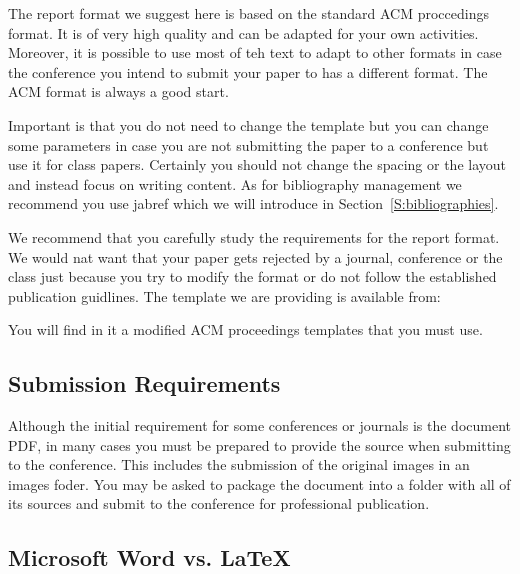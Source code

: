 The report format we suggest here is based on the standard ACM
proccedings format. It is of very high quality and can be adapted for
your own activities. Moreover, it is possible to use most of teh text to
adapt to other formats in case the conference you intend to submit your
paper to has a different format. The ACM format is always a good start.

Important is that you do not need to change the template but you can
change some parameters in case you are not submitting the paper to a
conference but use it for class papers. Certainly you should not change
the spacing or the layout and instead focus on writing content. As for
bibliography management we recommend you use jabref which we will
introduce in Section~\ref{S:bibliographies}.

We recommend that you carefully study the requirements for the report
format. We would nat want that your paper gets rejected by a journal,
conference or the class just because you try to modify the format or
do not follow the established publication guidlines. The template we
are providing is available from:


You will find in it a modified ACM proceedings templates that you must
use. 

\subsection{Submission Requirements}\label{submission-requirements}

Although the initial requirement for some conferences or journals is the
document PDF, in many cases you must be prepared to provide the source
when submitting to the conference. This includes the submission of the
original images in an images foder. You may be asked to package the
document into a folder with all of its sources and submit to the
conference for professional publication.

\subsection{Microsoft Word vs. \LaTeX}\label{microsoft-word}

